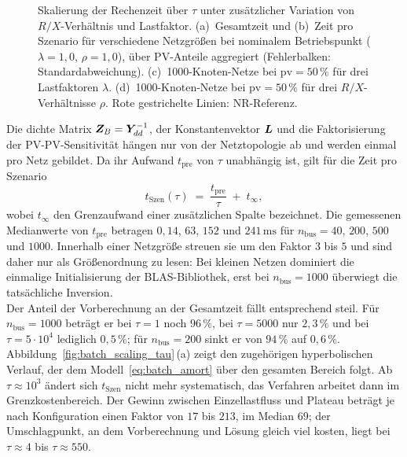 \begin{figure}[htbp]
	\centering
	
	\caption{Skalierung der Rechenzeit über $\tau$ unter zusätzlicher Variation
		von $R/X$-Verhältnis und Lastfaktor. (a)~Gesamtzeit und (b)~Zeit pro
		Szenario für verschiedene Netzgrößen bei nominalem Betriebspunkt
		($\lambda=1{,}0$, $\rho=1{,}0$), über PV-Anteile aggregiert (Fehlerbalken:
		Standardabweichung). (c)~1000-Knoten-Netze bei $\mathrm{pv}=50\,\%$ für
		drei Lastfaktoren $\lambda$. (d)~1000-Knoten-Netze bei $\mathrm{pv}=50\,\%$
		für drei $R/X$-Verhältnisse $\rho$. Rote gestrichelte Linien: NR-Referenz.}
	\label{fig:time_per_scenario_scalingsalazar}
\end{figure}









Die dichte Matrix $\boldsymbol{Z}_B=\boldsymbol{Y}_{dd}^{-1}$, der Konstantenvektor
$\boldsymbol{L}$ und die Faktorisierung der PV-PV-Sensitivität hängen nur von der
Netztopologie ab und werden einmal pro Netz gebildet. Da ihr Aufwand
$t_\mathrm{pre}$ von $\tau$ unabhängig ist, gilt für die Zeit pro Szenario
\begin{equation}
	t_\mathrm{Szen}(\tau) \;=\; \frac{t_\mathrm{pre}}{\tau} \;+\; t_\infty ,
	\label{eq:batch_amort}
\end{equation}
wobei $t_\infty$ den Grenzaufwand einer zusätzlichen Spalte bezeichnet. Die
gemessenen Medianwerte von $t_\mathrm{pre}$ betragen $0{,}14$, $63$, $152$ und
$241\,\mathrm{ms}$ für $n_\mathrm{bus}=40$, $200$, $500$ und $1000$. Innerhalb
einer Netzgröße streuen sie um den Faktor $3$ bis $5$ und sind daher nur als
Größenordnung zu lesen: Bei kleinen Netzen dominiert die einmalige
Initialisierung der BLAS-Bibliothek, erst bei $n_\mathrm{bus}=1000$ überwiegt
die tatsächliche Inversion.\\

Der Anteil der Vorberechnung an der Gesamtzeit fällt entsprechend steil. Für
$n_\mathrm{bus}=1000$ beträgt er bei $\tau=1$ noch $96\,\%$, bei $\tau=5000$
nur $2{,}3\,\%$ und bei $\tau=5\cdot10^4$ lediglich $0{,}5\,\%$; für
$n_\mathrm{bus}=200$ sinkt er von $94\,\%$ auf $0{,}6\,\%$.
Abbildung~\ref{fig:batch_scaling_tau}\,(a) zeigt den zugehörigen
hyperbolischen Verlauf, der dem Modell~\eqref{eq:batch_amort} über den
gesamten Bereich folgt. Ab $\tau\approx10^3$ ändert sich $t_\mathrm{Szen}$
nicht mehr systematisch, das Verfahren arbeitet dann im Grenzkostenbereich.
Der Gewinn zwischen Einzellastfluss und Plateau beträgt je nach Konfiguration
einen Faktor von $17$ bis $213$, im Median $69$; der Umschlagpunkt, an dem
Vorberechnung und Lösung gleich viel kosten, liegt bei $\tau\approx4$ bis
$\tau\approx550$.

